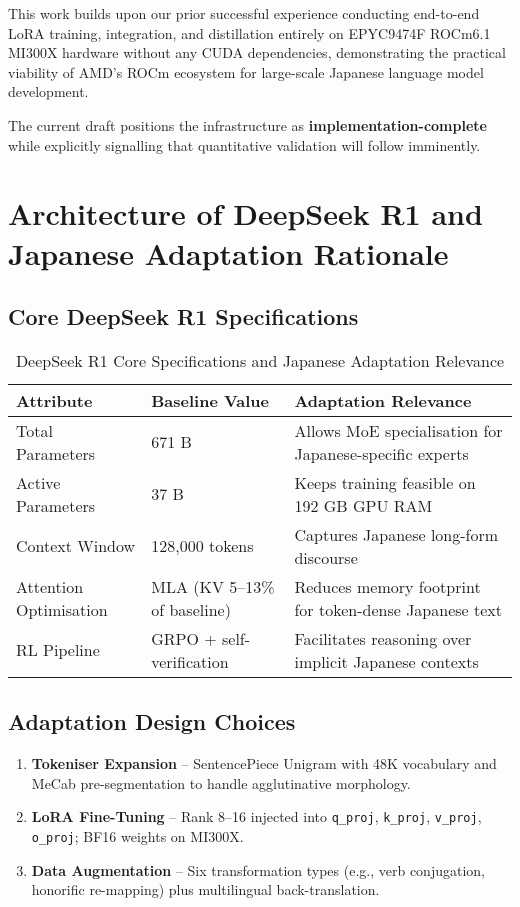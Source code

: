 \documentclass[12pt,a4paper]{article}
\begin{document}
This work builds upon our prior successful experience conducting end-to-end LoRA training, integration, and distillation entirely on EPYC9474F ROCm6.1 MI300X hardware without any CUDA dependencies, demonstrating the practical viability of AMD's ROCm ecosystem for large-scale Japanese language model development.

The current draft positions the infrastructure as \textbf{implementation-complete} while explicitly signalling that quantitative validation will follow imminently.

\section{Architecture of DeepSeek R1 and Japanese Adaptation Rationale}

\subsection{Core DeepSeek R1 Specifications}

\begin{table}[h]
\centering
\begin{tabular}{@{}lll@{}}
\toprule
\textbf{Attribute} & \textbf{Baseline Value} & \textbf{Adaptation Relevance} \\
\midrule
Total Parameters & 671 B & Allows MoE specialisation for Japanese-specific experts \\
Active Parameters & 37 B & Keeps training feasible on 192 GB GPU RAM \\
Context Window & 128,000 tokens & Captures Japanese long-form discourse \\
Attention Optimisation & MLA (KV 5–13\% of baseline) & Reduces memory footprint for token-dense Japanese text \\
RL Pipeline & GRPO + self-verification & Facilitates reasoning over implicit Japanese contexts \\
\bottomrule
\end{tabular}
\caption{DeepSeek R1 Core Specifications and Japanese Adaptation Relevance}
\label{tab:deepseek_specs}
\end{table}

\subsection{Adaptation Design Choices}

\begin{enumerate}
\item \textbf{Tokeniser Expansion} – SentencePiece Unigram with 48K vocabulary and MeCab pre-segmentation to handle agglutinative morphology.
\item \textbf{LoRA Fine-Tuning} – Rank 8–16 injected into \texttt{q\_proj}, \texttt{k\_proj}, \texttt{v\_proj}, \texttt{o\_proj}; BF16 weights on MI300X.
\item \textbf{Data Augmentation} – Six transformation types (e.g., verb conjugation, honorific re-mapping) plus multilingual back-translation.
\end{enumerate}
\end{document}
